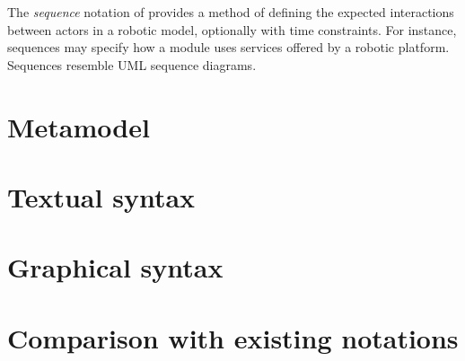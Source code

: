 
The \emph{sequence} notation of \langname{} provides a method of
defining the expected interactions between actors in a robotic model,
optionally with time constraints.  For instance, sequences may specify
how a \robochart{} module uses services offered by a robotic platform.
Sequences resemble UML sequence diagrams.

\chapter{Metamodel}\label{cha:metamodel}


\chapter{Textual syntax}\label{cha:seq-textual}


\chapter{Graphical syntax}\label{cha:seq-graphical}


\chapter{Comparison with existing notations}\label{cha:seq-comparison}


